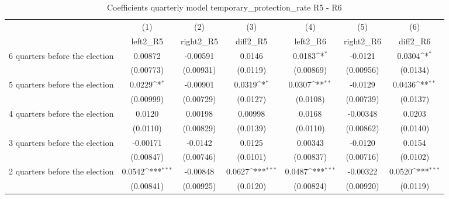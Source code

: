\begin{table}[htbp]\centering
\def\sym#1{\ifmmode^{#1}\else\(^{#1}\)\fi}
\caption{Coefficients quarterly model temporary\_protection\_rate R5 - R6}
\begin{tabular}{l*{6}{c}}
\hline\hline
                    &\multicolumn{1}{c}{(1)}&\multicolumn{1}{c}{(2)}&\multicolumn{1}{c}{(3)}&\multicolumn{1}{c}{(4)}&\multicolumn{1}{c}{(5)}&\multicolumn{1}{c}{(6)}\\
                    &\multicolumn{1}{c}{left2\_R5}&\multicolumn{1}{c}{right2\_R5}&\multicolumn{1}{c}{diff2\_R5}&\multicolumn{1}{c}{left2\_R6}&\multicolumn{1}{c}{right2\_R6}&\multicolumn{1}{c}{diff2\_R6}\\
\hline
 6 quarters before the election&     0.00872         &    -0.00591         &      0.0146         &      0.0183\sym{*}  &     -0.0121         &      0.0304\sym{*}  \\
                    &   (0.00773)         &   (0.00931)         &    (0.0119)         &   (0.00869)         &   (0.00956)         &    (0.0134)         \\
[1em]
 5 quarters before the election&      0.0229\sym{*}  &    -0.00901         &      0.0319\sym{*}  &      0.0307\sym{**} &     -0.0129         &      0.0436\sym{**} \\
                    &   (0.00999)         &   (0.00729)         &    (0.0127)         &    (0.0108)         &   (0.00739)         &    (0.0137)         \\
[1em]
 4 quarters before the election&      0.0120         &     0.00198         &     0.00998         &      0.0168         &    -0.00348         &      0.0203         \\
                    &    (0.0110)         &   (0.00829)         &    (0.0139)         &    (0.0110)         &   (0.00862)         &    (0.0140)         \\
[1em]
 3 quarters before the election&    -0.00171         &     -0.0142         &      0.0125         &     0.00343         &     -0.0120         &      0.0154         \\
                    &   (0.00847)         &   (0.00746)         &    (0.0101)         &   (0.00837)         &   (0.00716)         &    (0.0102)         \\
[1em]
 2 quarters before the election&      0.0542\sym{***}&    -0.00848         &      0.0627\sym{***}&      0.0487\sym{***}&    -0.00322         &      0.0520\sym{***}\\
                    &   (0.00841)         &   (0.00925)         &    (0.0120)         &   (0.00824)         &   (0.00920)         &    (0.0119)         \\

\end{tabular}
\end{table}
